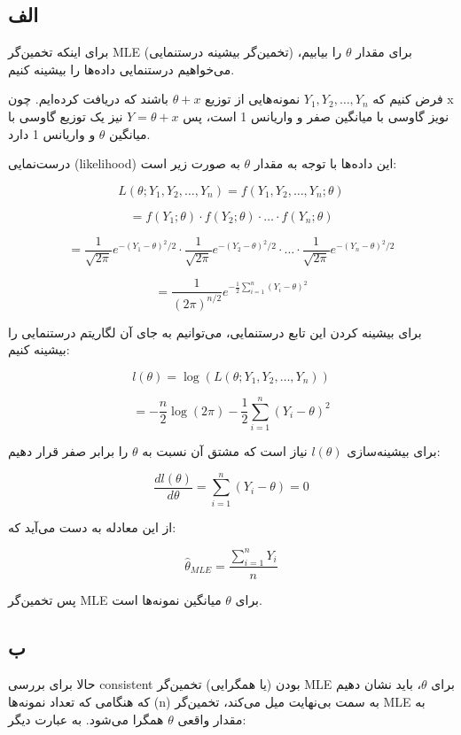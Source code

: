 \subsection*{الف}

برای اینکه تخمین‌گر
MLE
(تخمین‌گر بیشینه درستنمایی) برای مقدار
\(\theta\)
را بیابیم، می‌خواهیم درستنمایی داده‌ها را بیشینه کنیم. 

فرض کنیم که
\(Y_1, Y_2, \ldots, Y_n\)
نمونه‌هایی از توزیع
\(\theta + x\)
باشند که دریافت کرده‌ایم. چون x نویز گاوسی با میانگین صفر و واریانس 1 است، پس
\(Y = \theta + x\)
نیز یک توزیع گاوسی با میانگین
\(\theta\)
و واریانس 1 دارد.

درست‌نمایی (likelihood) این داده‌ها با توجه به مقدار \(\theta\) به صورت زیر است:

\[
L(\theta; Y_1, Y_2, \ldots, Y_n) = f(Y_1, Y_2, \ldots, Y_n; \theta) 
\]

\[
= f(Y_1; \theta) \cdot f(Y_2; \theta) \cdot \ldots \cdot f(Y_n; \theta)
\]

\[
= \frac{1}{\sqrt{2 \pi}} e^{-(Y_1 - \theta)^2 / 2} \cdot \frac{1}{\sqrt{2 \pi}} e^{-(Y_2 - \theta)^2 / 2} \cdot \ldots \cdot \frac{1}{\sqrt{2 \pi}} e^{-(Y_n - \theta)^2 / 2}
\]

\[
= \frac{1}{ (2 \pi)^{n/2}} e^{-\frac{1}{2} \sum_{i=1}^{n} (Y_i - \theta)^2}
\]

برای بیشینه کردن این تابع درستنمایی، می‌توانیم به جای آن لگاریتم درستنمایی را بیشینه کنیم:

\[
l(\theta) = \log(L(\theta; Y_1, Y_2, \ldots, Y_n))
\]

\[
= -\frac{n}{2} \log(2 \pi) - \frac{1}{2} \sum_{i=1}^{n} (Y_i - \theta)^2
\]

برای بیشینه‌سازی \(l(\theta)\) نیاز است که مشتق آن نسبت به \(\theta\) را برابر صفر قرار دهیم:

\[
\frac{dl(\theta)}{d\theta} = \sum_{i=1}^{n} (Y_i - \theta) = 0
\]

از این معادله به دست می‌آید که:

\[
\hat{\theta}_{MLE} = \frac{\sum_{i=1}^{n} Y_i}{n}
\]

پس تخمین‌گر MLE برای \(\theta\) میانگین نمونه‌ها است.

\subsection*{ب}

حالا برای بررسی consistent بودن (یا همگرایی) تخمین‌گر MLE برای \(\theta\)، باید نشان دهیم که هنگامی که تعداد نمونه‌ها (n) به سمت بی‌نهایت میل می‌کند، تخمین‌گر MLE به مقدار واقعی \(\theta\) همگرا می‌شود. به عبارت دیگر:

